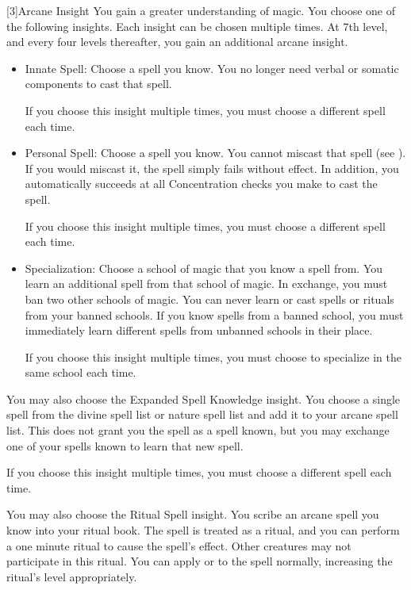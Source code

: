         [3]{Arcane Insight} 
        You gain a greater understanding of magic.
        You choose one of the following insights.
        Each insight can be chosen multiple times.
        At 7th level, and every four levels thereafter, you gain an additional arcane insight.
        \begin{itemize}
            \item Innate Spell: Choose a spell you know.
                You no longer need verbal or somatic components to cast that spell.
                \par If you choose this insight multiple times, you must choose a different spell each time.
            \item Personal Spell: Choose a spell you know.
                You cannot miscast that spell (see ).
                If you would miscast it, the spell simply fails without effect.
                In addition, you automatically succeeds at all Concentration checks you make to cast the spell.
                \par If you choose this insight multiple times, you must choose a different spell each time.
            \item Specialization: Choose a school of magic that you know a spell from.
                You learn an additional spell from that school of magic.
                In exchange, you must ban two other schools of magic.
                You can never learn or cast spells or rituals from your banned schools.
                If you know spells from a banned school, you must immediately learn different spells from unbanned schools in their place.
                \par If you choose this insight multiple times, you must choose to specialize in the same school each time.
        \end{itemize}

         You may also choose the Expanded Spell Knowledge insight.
        You choose a single spell from the divine spell list or nature spell list and add it to your arcane spell list.
        This does not grant you the spell as a spell known, but you may exchange one of your spells known to learn that new spell.
        \par If you choose this insight multiple times, you must choose a different spell each time.

         You may also choose the Ritual Spell insight.
        You scribe an arcane spell you know into your ritual book.
        The spell is treated as a ritual, and you can perform a one minute ritual to cause the spell's effect.
        Other creatures may not participate in this ritual.
        You can apply  or  to the spell normally, increasing the ritual's level appropriately.

